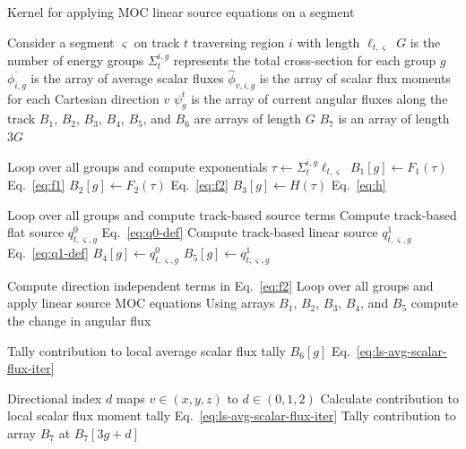 \begin{algorithm*}[!h]
	\caption{Kernel for applying \ac{MOC} linear source equations on a segment}
	\label{alg:ls-kernel}
	\begin{algorithmic}
		\State Consider a segment $\varsigma$ on track $t$ traversing region $i$ with length $\ell_{t,\varsigma}$ \hspace{\fill}
		\State $G$ is the number of energy groups
		\State $\Sigma_{t}^{i,g}$ represents the total cross-section for each group $g$
		\State $\overline{\phi_{i,g}}$ is the array of average scalar fluxes
		\State $\hat{\phi}_{v,i,g}$ is the array of scalar flux moments for each Cartesian direction $v$
		\State $\psi_g^{t}$ is the array of current angular fluxes along the track
		\State $B_1$, $B_2$, $B_3$, $B_4$, $B_5$, and $B_6$ are arrays of length $G$
		\State $B_7$ is an array of length $3G$
		
		 \Comment Loop over all groups and compute exponentials
		\vspace{0.1in}
		\State $\tau \gets \Sigma_{t}^{i,g} \ell_{t,\varsigma}$
		\State $B_1[g] \gets F_1(\tau)$ \Comment Eq.~\ref{eq:f1}
		\State $B_2[g] \gets F_2(\tau)$ \Comment Eq.~\ref{eq:f2}
		\State $B_3[g] \gets H(\tau)$ \Comment Eq.~\ref{eq:h}
		\vspace{0.1in}
		\EndFor
		\vspace{0.1in}
		
		 \Comment Loop over all groups and compute track-based source terms
		\vspace{0.1in}
		\State Compute track-based flat source $q^0_{t,\varsigma,g}$ \Comment Eq.~\ref{eq:q0-def}
		\State Compute track-based linear source $q^1_{t,\varsigma,g}$ \Comment Eq.~\ref{eq:q1-def}
		\State $B_4[g] \gets q^0_{t,\varsigma,g}$
		\State $B_5[g] \gets q^1_{t,\varsigma,g}$
		\vspace{0.1in}
		\EndFor
		\vspace{0.1in}
		
		\State Compute direction independent terms in Eq.~\ref{eq:f2}
		 \Comment Loop over all groups and apply linear source \ac{MOC} equations
		\vspace{0.1in}
		\State Using arrays $B_1$, $B_2$, $B_3$, $B_4$, and $B_5$ compute the change in angular flux
		
		\State Tally contribution to local average scalar flux tally $B_6[g]$ \Comment Eq.~\ref{eq:ls-avg-scalar-flux-iter}
		
		\vspace{0.1in}
		\State Directional index $d$ maps $v \in (x,y,z)$ to $d \in (0,1,2)$
		\State Calculate contribution to local scalar flux moment tally \Comment Eq.~\ref{eq:ls-avg-scalar-flux-iter}
		\State Tally contribution to array $B_7$ at $B_7[3g + d]$
		\EndFor
		\vspace{0.1in}
		

\end{algorithmic}
\end{algorithm*}
